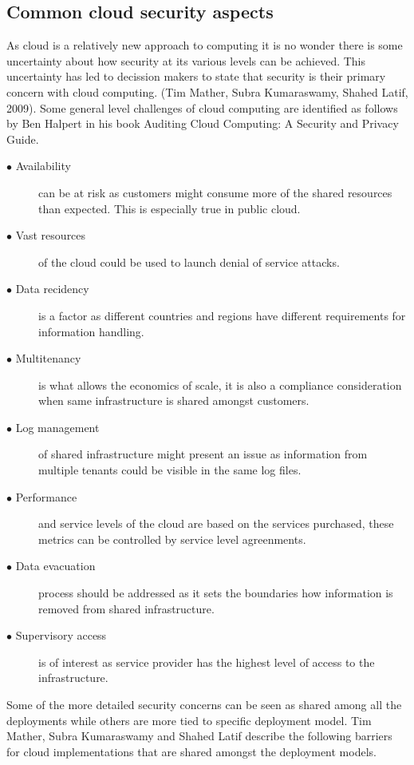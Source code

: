 \documentclass{article}
\begin{document}
\subsection{Common cloud security aspects}
As cloud is a relatively new approach to computing it is no wonder there is some uncertainty about how security at its various levels can be achieved. This uncertainty has led to decission makers to state that security is their primary concern with cloud computing. (Tim Mather, Subra Kumaraswamy, Shahed Latif, 2009). 
Some general level challenges of cloud computing are identified as follows by Ben Halpert in his book Auditing Cloud Computing: A Security and Privacy Guide.
\begin{description}
	\item[$\bullet$ Availability] can be at risk as customers might consume more of the shared resources than expected. This is especially true in public cloud.
	\item[$\bullet$ Vast resources] of the cloud could be used to launch denial of service attacks.
	\item[$\bullet$ Data recidency] is a factor as different countries and regions have different requirements for information handling.
	\item[$\bullet$ Multitenancy] is what allows the economics of scale, it is also a compliance consideration when same infrastructure is shared amongst customers.
	\item[$\bullet$ Log management] of shared infrastructure might present an issue as information from multiple tenants could be visible in the same log files. 
	\item[$\bullet$ Performance] and service levels of the cloud are based on the services purchased, these metrics can be controlled by service level agreenments.
	\item[$\bullet$ Data evacuation] process should be addressed as it sets the boundaries how information is removed from shared infrastructure.
	\item[$\bullet$ Supervisory access] is of interest as service provider has the highest level of access to the infrastructure.
\end{description}
Some of the more detailed security concerns can be seen as shared among all the deployments while others are more tied to specific deployment model.
Tim Mather, Subra Kumaraswamy and Shahed Latif describe the following barriers for cloud implementations that are shared amongst the deployment models.
\end{document}
